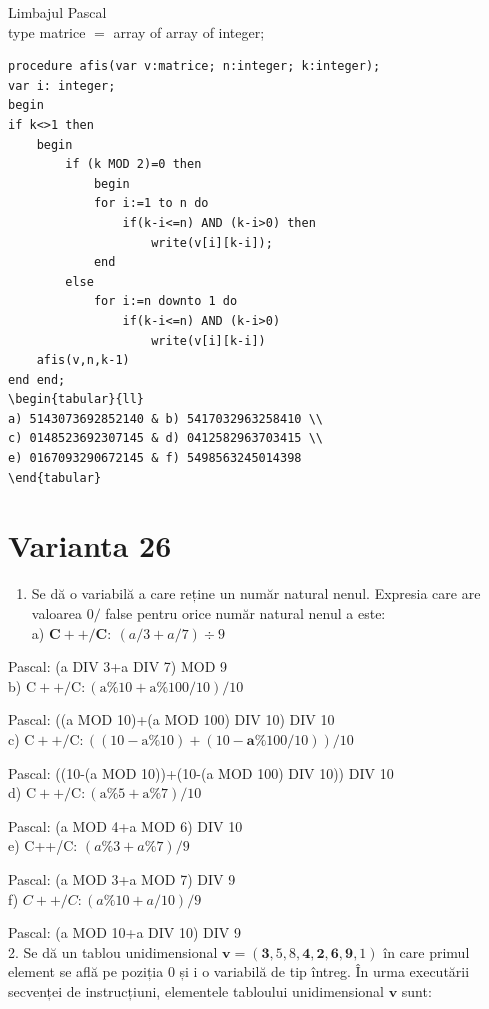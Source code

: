 \documentclass[10pt]{article}
\begin{document}
Limbajul Pascal\\
type matrice $=$ array of array of integer;

\begin{verbatim}
procedure afis(var v:matrice; n:integer; k:integer);
var i: integer;
begin
if k<>1 then
    begin
        if (k MOD 2)=0 then
            begin
            for i:=1 to n do
                if(k-i<=n) AND (k-i>0) then
                    write(v[i][k-i]);
            end
        else
            for i:=n downto 1 do
                if(k-i<=n) AND (k-i>0)
                    write(v[i][k-i])
    afis(v,n,k-1)
end end;
\begin{tabular}{ll} 
a) 5143073692852140 & b) 5417032963258410 \\
c) 0148523692307145 & d) 0412582963703415 \\
e) 0167093290672145 & f) 5498563245014398
\end{tabular}
\end{verbatim}

\section*{Varianta 26}
\begin{enumerate}
  \item Se dă o variabilă a care reține un număr natural nenul. Expresia care are valoarea $0 /$ false pentru orice număr natural nenul a este:\\
a) $\mathbf{C + + / C : ~}(a / 3+a / 7) \div 9$
\end{enumerate}

Pascal: (a DIV 3+a DIV 7) MOD 9\\
b) $\mathrm{C}++/ \mathrm{C}:(\mathrm{a} \% 10+\mathrm{a} \% 100 / 10) / 10$

Pascal: ((a MOD 10)+(a MOD 100) DIV 10) DIV 10\\
c) $\mathrm{C}++/ \mathrm{C}:((10-\mathrm{a} \% 10)+(10-\mathbf{a} \% 100 / 10)) / 10$

Pascal: ((10-(a MOD 10))+(10-(a MOD 100) DIV 10)) DIV 10\\
d) $\mathrm{C}++/ \mathrm{C}:(\mathrm{a} \% 5+\mathrm{a} \% 7) / 10$

Pascal: (a MOD 4+a MOD 6) DIV 10\\
e) C++/C: $(a \% 3+a \% 7) / 9$

Pascal: (a MOD 3+a MOD 7) DIV 9\\
f) $C++/ C:(a \% 10+a / 10) / 9$

Pascal: (a MOD 10+a DIV 10) DIV 9\\
2. Se dă un tablou unidimensional $\mathbf{v}=(\mathbf{3}, 5,8, \mathbf{4}, \mathbf{2}, \mathbf{6}, \mathbf{9}, 1)$ în care primul element se află pe poziția 0 și i o variabilă de tip întreg. În urma executării secvenței de instrucțiuni, elementele tabloului unidimensional $\mathbf{v}$ sunt:
\end{document}
